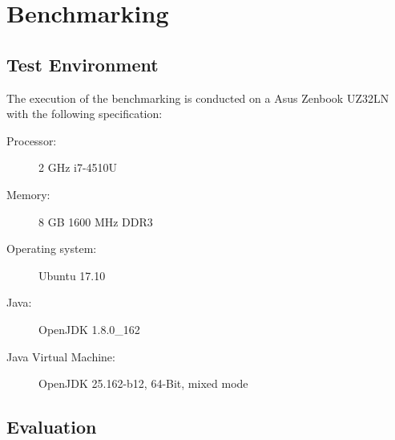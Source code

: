 \chapter{Benchmarking}


\section{Test Environment}
The execution of the benchmarking is conducted on a Asus Zenbook UZ32LN with the following specification:

\begin{description}
	\item [Processor:] 2 GHz i7-4510U
	\item [Memory:] 8 GB 1600 MHz DDR3
	\item [Operating system:] Ubuntu 17.10
	\item [Java:] OpenJDK 1.8.0\_162
	\item [Java Virtual Machine:] OpenJDK 25.162-b12, 64-Bit, mixed mode
\end{description}


\section{Evaluation}